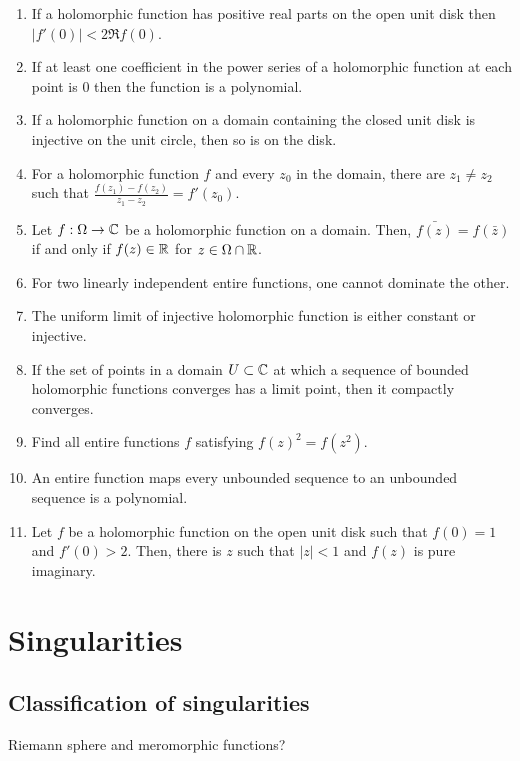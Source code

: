 \documentclass{../note}
\begin{document}
\begin{enumerate}
\item If a holomorphic function has positive real parts on the open unit disk then $|f'(0)|<2\Re f(0)$.
\item If at least one coefficient in the power series of a holomorphic function at each point is 0 then the function is a polynomial.
\item If a holomorphic function on a domain containing the closed unit disk is injective on the unit circle, then so is on the disk.
\item For a holomorphic function $f$ and every $z_0$ in the domain, there are $z_1\ne z_2$ such that $\frac{f(z_1)-f(z_2)}{z_1-z_2}=f'(z_0)$.
\item Let $f:\Omega\to\mathbb{C}$ be a holomorphic function on a domain. Then, $\bar{f(z)}=f(\bar z)$ if and only if $f(z)\in\mathbb{R}$ for $z\in\Omega\cap\mathbb{R}$.
\item For two linearly independent entire functions, one cannot dominate the other.
\item The uniform limit of injective holomorphic function is either constant or injective.
\item If the set of points in a domain $U\subset\mathbb{C}$ at which a sequence of bounded holomorphic functions converges has a limit point, then it compactly converges.
\item Find all entire functions $f$ satisfying $f(z)^2=f(z^2)$.
\item An entire function maps every unbounded sequence to an unbounded sequence is a polynomial.
\item Let $f$ be a holomorphic function on the open unit disk such that $f(0)=1$ and $f'(0)>2$. Then, there is $z$ such that $|z|<1$ and $f(z)$ is pure imaginary.
\end{enumerate}



\chapter{Singularities}

\section{Classification of singularities}
\begin{prb}
\end{prb}
\begin{prb}
\end{prb}
\begin{prb}
\end{prb}
\begin{prb}
\end{prb}
\begin{prb}
\end{prb}
Riemann sphere and meromorphic functions?
\end{document}
